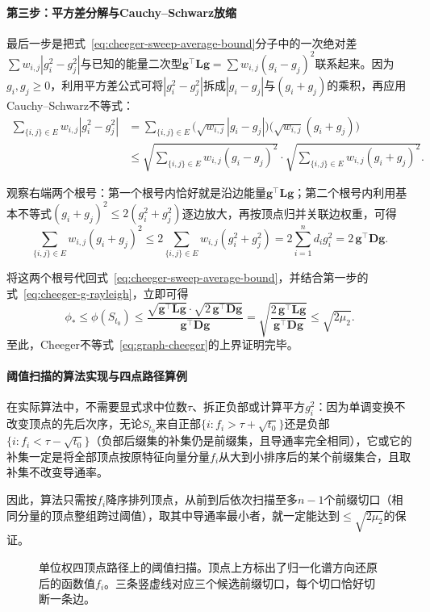 \paragraph{第三步：平方差分解与Cauchy--Schwarz放缩}

最后一步是把式~\eqref{eq:cheeger-sweep-average-bound}分子中的一次绝对差$\sum w_{i,j}|g_i^2-g_j^2|$与已知的能量二次型$\bm g^\top\bm L\bm g=\sum w_{i,j}(g_i-g_j)^2$联系起来。因为$g_i,g_j\geq 0$，利用平方差公式可将$|g_i^2-g_j^2|$拆成$|g_i-g_j|$与$(g_i+g_j)$的乘积，再应用Cauchy--Schwarz不等式：
\[
\begin{aligned}
\sum_{\{i,j\}\in E}w_{i,j}|g_i^2-g_j^2|
&= \sum_{\{i,j\}\in E}\bigl(\sqrt{w_{i,j}}|g_i-g_j|\bigr)\bigl(\sqrt{w_{i,j}}(g_i+g_j)\bigr) \\
&\leq
\sqrt{\sum_{\{i,j\}\in E}w_{i,j}(g_i-g_j)^2}
\cdot
\sqrt{\sum_{\{i,j\}\in E}w_{i,j}(g_i+g_j)^2}.
\end{aligned}
\]

观察右端两个根号：第一个根号内恰好就是沿边能量$\bm g^\top\bm L\bm g$；第二个根号内利用基本不等式$(g_i+g_j)^2\leq 2(g_i^2+g_j^2)$逐边放大，再按顶点归并关联边权重，可得
\[
\sum_{\{i,j\}\in E}w_{i,j}(g_i+g_j)^2
\leq 2\sum_{\{i,j\}\in E}w_{i,j}(g_i^2+g_j^2)
= 2\sum_{i=1}^n d_ig_i^2
= 2\,\bm g^\top\bm D\bm g.
\]

将这两个根号代回式~\eqref{eq:cheeger-sweep-average-bound}，并结合第一步的式~\eqref{eq:cheeger-g-rayleigh}，立即可得
\[
\phi_*\leq\phi(S_{t_0})
\leq\frac{\sqrt{\bm g^\top\bm L\bm g}\cdot\sqrt{2\,\bm g^\top\bm D\bm g}}
         {\bm g^\top\bm D\bm g}
=\sqrt{\frac{2\,\bm g^\top\bm L\bm g}{\bm g^\top\bm D\bm g}}
\leq\sqrt{2\mu_2}.
\]
至此，Cheeger不等式~\eqref{eq:graph-cheeger}的上界证明完毕。

\paragraph{阈值扫描的算法实现与四点路径算例}

在实际算法中，不需要显式求中位数$\tau$、拆正负部或计算平方$g_i^2$：因为单调变换不改变顶点的先后次序，无论$S_{t_0}$来自正部$\{i:f_i>\tau+\sqrt{t_0}\}$还是负部$\{i:f_i<\tau-\sqrt{t_0}\}$（负部后缀集的补集仍是前缀集，且导通率完全相同），它或它的补集一定是将全部顶点按原特征向量分量$f_i$从大到小排序后的某个前缀集合，且取补集不改变导通率。

因此，算法只需按$f_i$降序排列顶点，从前到后依次扫描至多$n-1$个前缀切口（相同分量的顶点整组跨过阈值），取其中导通率最小者，就一定能达到$\leq\sqrt{2\mu_2}$的保证。

\begin{figure}[htbp]
\centering

\caption{单位权四顶点路径上的阈值扫描。顶点上方标出了归一化谱方向还原后的函数值$f_i$。三条竖虚线对应三个候选前缀切口，每个切口恰好切断一条边。}
\label{fig:graph-cheeger-path-sweep}
\end{figure}

